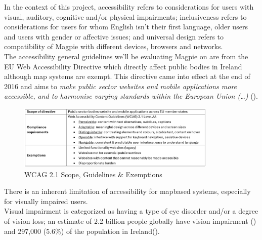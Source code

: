 In the context of this project, accessibility refers to considerations for users with visual, auditory, cognitive and/or physical impairments; inclusiveness refers to considerations for users for whom English isn't their first language, older users and users with gender or affective issues; and universal design refers to compatibility of Magpie with different devices, browsers and networks.\\

\noindent The accessibility general guidelines we'll be evaluating Magpie on are from the EU Web Accessibility Directive which directly affect public bodies in Ireland although map systems are exempt. This directive came into effect at the end of 2016 and aims to \emph{make public sector websites and mobile applications more accessible, and to harmonise varying standards within the European Union (\ldots)} (\cite{webaccessibilitydirective2016}).\\
\begin{figure}[h!]
    \centering
    \includegraphics[width=0.85\textwidth]{images/wcag-guidelines.png}
    \caption{WCAG 2.1 Scope, Guidelines \& Exemptions}
\end{figure}

\noindent There is an inherent limitation of accessibility for map\-based systems, especially for visually impaired users.\\Visual impairment is categorized as having a type of eye disorder and/or a degree of vision loss; an estimate of 2.2 billion people globally have vision impairment (\cite{whoworldreportvision2019}) and 297,000 (5.6\%) of the population in Ireland(\cite{visionirelandcensus}).\\

